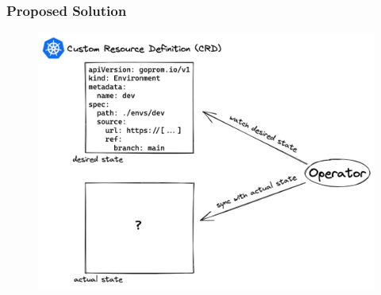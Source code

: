 \documentclass{beamer}
\begin{document}
\begin{frame}
\frametitle{Proposed Solution}

\begin{figure}[h]
	\centering
	\includegraphics[width=.90\linewidth]{assets/crd-desired-actual-state-operator.png}
	\label{fig:crdDesiredActualStateOperator}	
\end{figure}






\end{frame}
\end{document}
